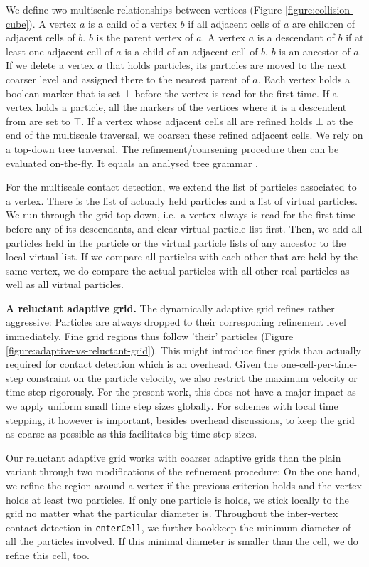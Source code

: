 \documentclass[times,12pt]{article}
\begin{document}
We define two multiscale relationships between vertices (Figure
\ref{figure:collision-cube}).
A vertex $a$ is a child of a vertex $b$ if all adjacent cells of $a$ are
children of adjacent cells of $b$. $b$ is the parent vertex of $a$.
A vertex $a$ is a descendant of $b$ if at least one adjacent cell of $a$ is a
child of an adjacent cell of $b$. $b$ is an ancestor of $a$.
If we delete a vertex $a$ that holds particles, its particles are moved to the
next coarser level and assigned there to the nearest parent of $a$.
Each vertex holds a boolean marker that is set $\bot $ before the vertex is
read for the first time.
If a vertex holds a particle, all the markers of the vertices where it is a
descendent from are set to $\top$.
If a vertex whose adjacent cells all are refined holds $\bot$ at the end of the
multiscale traversal, we coarsen these refined adjacent cells.
We rely on a top-down tree traversal.
The refinement/coarsening procedure then can be evaluated on-the-fly.
It equals an analysed tree grammar \cite{Knuth71}.

For the multiscale contact detection, we extend the list of particles associated
to a vertex. 
There is the list of actually held particles and a list of virtual particles. 
We run through the grid top down, i.e.~a vertex always is read for the first
time before any of its descendants, and clear virtual particle list first.
Then, we add all particles held in the particle or the virtual particle lists of
any ancestor to the local virtual list.
If we compare all particles with each other that are held by the same vertex, we
do compare the actual particles with all other real particles as well as all
virtual particles.

{\bf A reluctant adaptive grid.}
The dynamically adaptive grid refines rather aggressive: Particles are always
dropped to their corresponing refinement level immediately. 
Fine grid regions thus follow 'their' particles (Figure
\ref{figure:adaptive-vs-reluctant-grid}).
This might introduce finer grids than actually required for contact detection
which is an overhead.
Given the one-cell-per-time-step constraint on the particle velocity, we also
restrict the maximum velocity or time step rigorously.
For the present work, this does not have a major impact as we apply uniform
small time step sizes globally. 
For schemes with local time stepping, it however is important, besides overhead
discussions, to keep the grid as coarse as possible as this facilitates big
time step sizes.

Our reluctant adaptive grid works with coarser adaptive grids than the plain
variant through two modifications of the refinement procedure: 
On the one hand, we refine the region around a vertex if the previous criterion
holds and the vertex holds at least two particles.
If only one particle is holds, we stick locally to the grid no matter what the
particular diameter is.
Throughout the inter-vertex contact detection in \texttt{enterCell}, we further
bookkeep the minimum diameter of all the particles involved. 
If this minimal diameter is smaller than the cell, we do refine this cell, too.
\end{document}
